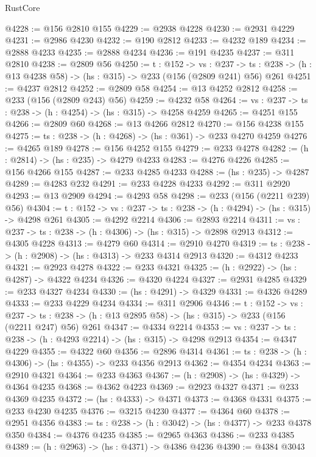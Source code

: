 \begin{lexlean}{RustCore}
\begin{coremodule}
@4228 := @156 @2810 @155
@4229 := @2938 @4228
@4230 := @2931 @4229
@4231 := @2986 @4230
@4232 := @190 @2812
@4233 := @4232 @189
@4234 := @2888 @4233
@4235 := @2888 @4234
@4236 := @191 @4235
@4237 := @311 @2810
@4238 := @2809 @56
@4250 := {t : @152} ->
  {vs : @237} ->
  {ts : @238} -> (h : @13 @4238 @58) -> (hs : @315) -> @233 (@156 (@2809 @241) @56) @261
@4251 := @4237 @2812
@4252 := @2809 @58
@4254 := @13 @4252 @2812
@4258 := @233 (@156 (@2809 @243) @56)
@4259 := @4232 @58
@4264 := {vs : @237} -> {ts : @238} -> (h : @4254) -> (hs : @315) -> @4258 @4259
@4265 := @4251 @155
@4266 := @2809 @60
@4268 := @13 @4266 @2812
@4270 := @156 @4238 @155
@4275 := {ts : @238} -> (h : @4268) -> (hs : @361) -> @233 @4270 @4259
@4276 := @4265 @189
@4278 := @156 @4252 @155
@4279 := @233 @4278
@4282 := (h : @2814) -> (hs : @235) -> @4279 @4233
@4283 := @4276 @4226
@4285 := @156 @4266 @155
@4287 := @233 @4285 @4233
@4288 := (hs : @235) -> @4287
@4289 := @4283 @232
@4291 := @233 @4228 @4233
@4292 := @311 @2920
@4293 := @13 @2909
@4294 := @4293 @58
@4298 := @233 (@156 (@2211 @239) @56)
@4304 := {t : @152} -> {vs : @237} -> {ts : @238} -> (h : @4294) -> (hs : @315) -> @4298 @261
@4305 := @4292 @2214
@4306 := @2893 @2214
@4311 := {vs : @237} -> {ts : @238} -> (h : @4306) -> (hs : @315) -> @2898 @2913
@4312 := @4305 @4228
@4313 := @4279 @60
@4314 := @2910 @4270
@4319 := {ts : @238} -> (h : @2908) -> (hs : @4313) -> @233 @4314 @2913
@4320 := @4312 @4233
@4321 := @2923 @4278
@4322 := @233 @4321
@4325 := (h : @2922) -> (hs : @4287) -> @4322 @4234
@4326 := @4320 @4224
@4327 := @2931 @4285
@4329 := @233 @4327 @4234
@4330 := (hs : @4291) -> @4329
@4331 := @4326 @4289
@4333 := @233 @4229 @4234
@4334 := @311 @2906
@4346 := {t : @152} ->
  {vs : @237} ->
  {ts : @238} -> (h : @13 @2895 @58) -> (hs : @315) -> @233 (@156 (@2211 @247) @56) @261
@4347 := @4334 @2214
@4353 := {vs : @237} -> {ts : @238} -> (h : @4293 @2214) -> (hs : @315) -> @4298 @2913
@4354 := @4347 @4229
@4355 := @4322 @60
@4356 := @2896 @4314
@4361 := {ts : @238} -> (h : @4306) -> (hs : @4355) -> @233 @4356 @2913
@4362 := @4354 @4234
@4363 := @2910 @4321
@4364 := @233 @4363
@4367 := (h : @2908) -> (hs : @4329) -> @4364 @4235
@4368 := @4362 @4223
@4369 := @2923 @4327
@4371 := @233 @4369 @4235
@4372 := (hs : @4333) -> @4371
@4373 := @4368 @4331
@4375 := @233 @4230 @4235
@4376 := @3215 @4230
@4377 := @4364 @60
@4378 := @2951 @4356
@4383 := {ts : @238} -> (h : @3042) -> (hs : @4377) -> @233 @4378 @350
@4384 := @4376 @4235
@4385 := @2965 @4363
@4386 := @233 @4385
@4389 := (h : @2963) -> (hs : @4371) -> @4386 @4236
@4390 := @4384 @3043

\end{coremodule}
\end{lexlean}

